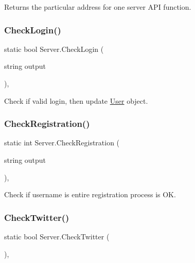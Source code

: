 Returns the particular address for one server A\+PI function. 

\mbox{\label{class_server_a14b1c4d9f09ef86474d7675abce7258a}} 
\subsubsection{\texorpdfstring{CheckLogin()}{CheckLogin()}}
{\footnotesize\ttfamily static bool Server.\+Check\+Login (\begin{DoxyParamCaption}\item[{string}]{output }\end{DoxyParamCaption})\hspace{0.3cm}{\ttfamily [inline]}, {\ttfamily [static]}}



Check if valid login, then update \mbox{\hyperlink{class_user}{User}} object. 

\mbox{\label{class_server_a4fe4bf9d73c95a59d6f2b07faf93c7a2}} 
\subsubsection{\texorpdfstring{CheckRegistration()}{CheckRegistration()}}
{\footnotesize\ttfamily static int Server.\+Check\+Registration (\begin{DoxyParamCaption}\item[{string}]{output }\end{DoxyParamCaption})\hspace{0.3cm}{\ttfamily [inline]}, {\ttfamily [static]}}



Check if username is entire registration process is OK. 

\mbox{\label{class_server_aaf401398cccdc041ad7bb2a64c8323f8}} 
\subsubsection{\texorpdfstring{CheckTwitter()}{CheckTwitter()}}
{\footnotesize\ttfamily static bool Server.\+Check\+Twitter (\begin{DoxyParamCaption}{ }\end{DoxyParamCaption})\hspace{0.3cm}{\ttfamily [inline]}, {\ttfamily [static]}}



